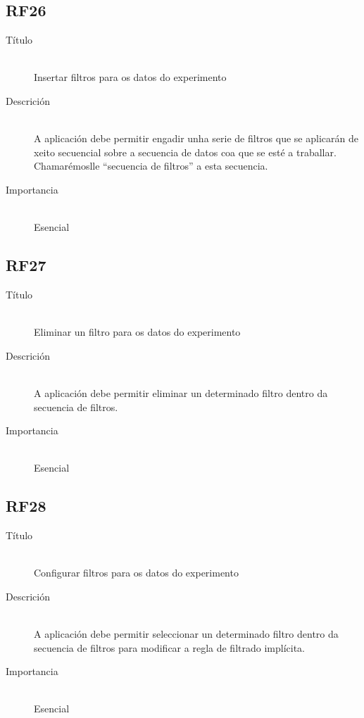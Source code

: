 \subsection*{RF26}
\begin{description}
\item[Título] \hfill \\
Insertar filtros para os datos do experimento
\item[Descrición] \hfill \\
A aplicación debe permitir engadir unha serie de filtros que se aplicarán de xeito secuencial sobre a secuencia de datos coa que se esté a traballar. Chamarémoslle ``secuencia de filtros'' a esta secuencia.
\item[Importancia] \hfill \\
Esencial
\end{description}

\subsection*{RF27}
\begin{description}
\item[Título] \hfill \\
Eliminar un filtro para os datos do experimento
\item[Descrición] \hfill \\
A aplicación debe permitir eliminar un determinado filtro dentro da secuencia de filtros.
\item[Importancia] \hfill \\
Esencial
\end{description}

\subsection*{RF28}
\begin{description}
\item[Título] \hfill \\
Configurar filtros para os datos do experimento
\item[Descrición] \hfill \\
A aplicación debe permitir seleccionar un determinado filtro dentro da secuencia de filtros para modificar a regla de filtrado implícita.
\item[Importancia] \hfill \\
Esencial
\end{description}


